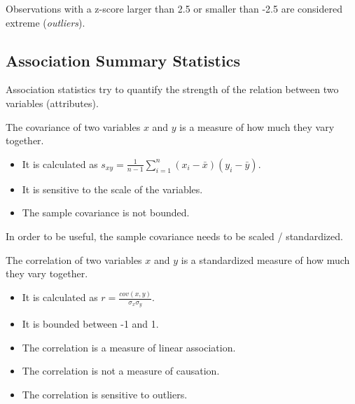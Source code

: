 \begin{remark}
    Observations with a z-score larger than 2.5 or smaller than -2.5 are considered extreme (\emph{outliers}).
\end{remark}

\subsection{Association Summary Statistics}
Association statistics try to quantify the strength of the relation between two variables (attributes).

\begin{definition}
    The covariance of two variables $x$ and $y$ is a measure of how much they vary together.
    \begin{itemize}
        \item It is calculated as $s_{xy} = \displaystyle\frac{1}{n-1}\sum_{i=1}^{n}(x_i-\bar{x})(y_i-\bar{y})$.
        \item It is sensitive to the scale of the variables.
        \item The sample covariance is not bounded.
    \end{itemize}
\end{definition}

In order to be useful, the sample covariance needs to be scaled / standardized.

\begin{definition}
    The correlation of two variables $x$ and $y$ is a standardized measure of how much they vary together.
    \begin{itemize}
        \item It is calculated as $r = \displaystyle\frac{cov(x,y)}{\sigma_x\sigma_y}$.
        \item It is bounded between -1 and 1.
    \end{itemize}
\end{definition}

\begin{remark}
    
    \begin{itemize}
        \item The correlation is a measure of linear association.
        \item The correlation is not a measure of causation.
        \item The correlation is sensitive to outliers.
    \end{itemize}

\end{remark}

